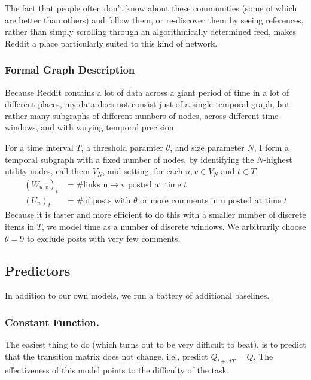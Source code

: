\documentclass{article}
\theoremstyle{definition}
\begin{document}
	The fact that people often don't know about these communities (some of which are better than others) and follow them, or re-discover them by seeing references, rather than simply scrolling through an algorithmically determined feed, makes Reddit a place particularly suited to this kind of network.
	
	\subsubsection{Formal Graph Description} \label{sec:formalmodel}
	
	Because Reddit contains a lot of data across a giant period of time in a lot of different places, my data does not consist just of a single temporal graph, but rather many subgraphs of different numbers of nodes, across different time windows, and with varying temporal precision.
	
	For a time interval $T$, a threshold paramter $\theta$, and size parameter $N$, I form a temporal subgraph with a fixed number of nodes, by identifying the $N$-highest utility nodes, call them $V_N$, and setting, for each $u,v \in V_N$ and $t \in T$,
	\begin{align*}
		(W_{u,v})_t &= \text{\# links u$\to$v posted at time $t$} \\
		(U_{u})_t &= \text{\# of posts with $\theta$ or more comments in u posted at time $t$}
	\end{align*}
	Because it is faster and more efficient to do this with a smaller number of discrete items in $T$, we model time as a number of discrete windows. We arbitrarily choose $\theta = 9$ to exclude posts with very few comments. 
	
	\subsection{Predictors}
	In addition to our own models, we run a battery of additional baselines.
	
	\subsubsection{Constant Function.} The easiest thing to do (which turns out to be very difficult to beat), is to predict that the transition matrix does not change, i.e., predict $Q_{t+\Delta T} = Q$. The effectiveness of this model points to the difficulty of the task.
	
\end{document}
